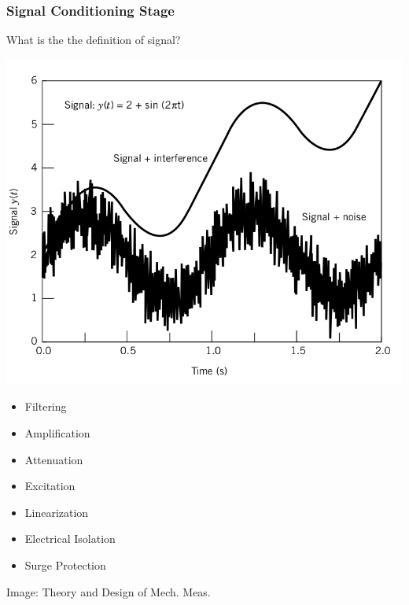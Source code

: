 \documentclass[fleqn]{beamer} %
\begin{document}
			\begin{frame}
				\frametitle{Signal Conditioning Stage}

				What is the the definition of {\BL signal}? \vspc

				\begin{multicols}{2}
				\includegraphics[scale=0.18]{images/signal_noise.png}

				\begin{itemize}
				\item Filtering
				\item Amplification
				\item Attenuation
				\item Excitation 
				\item Linearization
				\item Electrical Isolation
				\item Surge Protection
				\end{itemize}

				\end{multicols}

				{\tiny Image: Theory and Design of Mech. Meas.}
			\end{frame}
\end{document}
